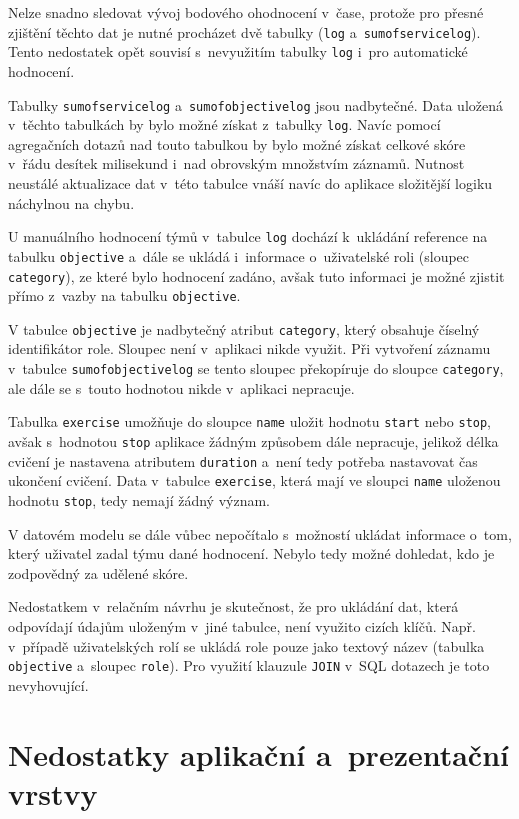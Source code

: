 \documentclass[
  digital,
  twoside,
  table, 
  nolof, 
  nolot
]{fithesis3}
\begin{document}
Nelze snadno sledovat vývoj bodového ohodnocení v~čase, protože pro přesné zjištění těchto dat je nutné procházet dvě tabulky (\texttt{log} a~\texttt{sumofservicelog}). Tento nedostatek opět souvisí s~nevyužitím tabulky \texttt{log} i~pro automatické hodnocení.

Tabulky \texttt{sumofservicelog} a~\texttt{sumofobjectivelog} jsou nadbytečné. Data uložená v~těchto tabulkách by bylo možné získat z~tabulky \texttt{log}. Navíc pomocí agregačních dotazů nad touto tabulkou by bylo možné získat celkové skóre v~řádu desítek milisekund i~nad obrovským množstvím záznamů. Nutnost neustálé aktualizace dat v~této tabulce vnáší navíc do aplikace složitější logiku náchylnou na chybu. 

U manuálního hodnocení týmů v~tabulce \texttt{log} dochází k~ukládání reference na tabulku \texttt{objective} a~dále se ukládá i~informace o~uživatelské roli (sloupec \texttt{category}), ze které bylo hodnocení zadáno, avšak tuto informaci je možné zjistit přímo z~vazby na tabulku \texttt{objective}.

V tabulce \texttt{objective} je nadbytečný atribut \texttt{category}, který obsahuje číselný identifikátor role. Sloupec není v~aplikaci nikde využit. Při vytvoření záznamu v~tabulce \texttt{sumofobjectivelog} se tento sloupec překopíruje do sloupce \texttt{category}, ale dále se s~touto hodnotou nikde v~aplikaci nepracuje.

Tabulka \texttt{exercise} umožňuje do sloupce \texttt{name} uložit hodnotu \texttt{start} nebo \texttt{stop}, avšak s~hodnotou \texttt{stop} aplikace žádným způsobem dále nepracuje, jelikož délka cvičení je nastavena atributem \texttt{duration} a~není tedy potřeba nastavovat čas ukončení cvičení. Data v~tabulce \texttt{exercise}, která mají ve sloupci \texttt{name} uloženou hodnotu \texttt{stop}, tedy nemají žádný význam.

V datovém modelu se dále vůbec nepočítalo s~možností ukládat informace o~tom, který uživatel zadal týmu dané hodnocení. Nebylo tedy možné dohledat, kdo je zodpovědný za udělené skóre.

Nedostatkem v~relačním návrhu je skutečnost, že pro ukládání dat, která odpovídají údajům uloženým v~jiné tabulce, není využito cizích klíčů. Např. v~případě uživatelských rolí se ukládá role pouze jako textový název (tabulka \texttt{objective} a~sloupec \texttt{role}). Pro využití klauzule \texttt{JOIN} v~SQL dotazech je toto nevyhovující.

\section{Nedostatky aplikační a~prezentační vrstvy}
\end{document}
